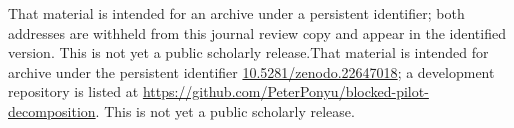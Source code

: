 \ifdefined\ANONYMOUS That material is intended for an archive under a persistent identifier; both addresses are withheld from this journal review copy and appear in the identified version. This is not yet a public scholarly release.\else That material is intended for archive under the persistent identifier \href{https://doi.org/10.5281/zenodo.22647018}{10.5281/zenodo.22647018}; a development repository is listed at \url{https://github.com/PeterPonyu/blocked-pilot-decomposition}. This is not yet a public scholarly release.\fi
